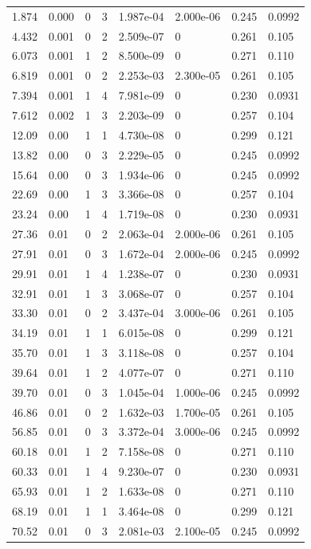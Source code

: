 \documentclass[preview]{standalone}
\begin{document}
{{\begin{tabular}{L{1.2cm}C{1.2cm} C{0.3cm}C{0.5cm} C{1.4cm}C{1.4cm} C{1.4cm}C{1.4cm}}
  1.874  &  0.000  & 0     &  3 &  1.987e-04  & 2.000e-06  & 0.245 &  0.0992   \\ 
  4.432  &  0.001  & 0     &  2 &  2.509e-07  & 0  & 0.261 &  0.105   \\ 
  6.073  &  0.001  & 1     &  2 &  8.500e-09  & 0  & 0.271 &  0.110   \\ 
  6.819  &  0.001  & 0     &  2 &  2.253e-03  & 2.300e-05  & 0.261 &  0.105   \\ 
  7.394  &  0.001  & 1     &  4 &  7.981e-09  & 0  & 0.230 &  0.0931   \\ 
  7.612  &  0.002  & 1     &  3 &  2.203e-09  & 0  & 0.257 &  0.104   \\ 
  12.09  &  0.00  & 1     &  1 &  4.730e-08  & 0  & 0.299 &  0.121   \\ 
  13.82  &  0.00  & 0     &  3 &  2.229e-05  & 0  & 0.245 &  0.0992   \\ 
  15.64  &  0.00  & 0     &  3 &  1.934e-06  & 0  & 0.245 &  0.0992   \\ 
  22.69  &  0.00  & 1     &  3 &  3.366e-08  & 0  & 0.257 &  0.104   \\ 
  23.24  &  0.00  & 1     &  4 &  1.719e-08  & 0  & 0.230 &  0.0931   \\ 
  27.36  &  0.01  & 0     &  2 &  2.063e-04  & 2.000e-06  & 0.261 &  0.105   \\ 
  27.91  &  0.01  & 0     &  3 &  1.672e-04  & 2.000e-06  & 0.245 &  0.0992   \\ 
  29.91  &  0.01  & 1     &  4 &  1.238e-07  & 0  & 0.230 &  0.0931   \\ 
  32.91  &  0.01  & 1     &  3 &  3.068e-07  & 0  & 0.257 &  0.104   \\ 
  33.30  &  0.01  & 0     &  2 &  3.437e-04  & 3.000e-06  & 0.261 &  0.105   \\ 
  34.19  &  0.01  & 1     &  1 &  6.015e-08  & 0  & 0.299 &  0.121   \\ 
  35.70  &  0.01  & 1     &  3 &  3.118e-08  & 0  & 0.257 &  0.104   \\ 
  39.64  &  0.01  & 1     &  2 &  4.077e-07  & 0  & 0.271 &  0.110   \\ 
  39.70  &  0.01  & 0     &  3 &  1.045e-04  & 1.000e-06  & 0.245 &  0.0992   \\ 
  46.86  &  0.01  & 0     &  2 &  1.632e-03  & 1.700e-05  & 0.261 &  0.105   \\ 
  56.85  &  0.01  & 0     &  3 &  3.372e-04  & 3.000e-06  & 0.245 &  0.0992   \\ 
  60.18  &  0.01  & 1     &  2 &  7.158e-08  & 0  & 0.271 &  0.110   \\ 
  60.33  &  0.01  & 1     &  4 &  9.230e-07  & 0  & 0.230 &  0.0931   \\ 
  65.93  &  0.01  & 1     &  2 &  1.633e-08  & 0  & 0.271 &  0.110   \\ 
  68.19  &  0.01  & 1     &  1 &  3.464e-08  & 0  & 0.299 &  0.121   \\ 
  70.52  &  0.01  & 0     &  3 &  2.081e-03  & 2.100e-05  & 0.245 &  0.0992   \\ 
\hline 
\end{tabular} 

}}
\end{document}
